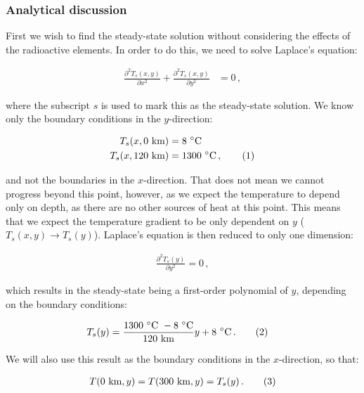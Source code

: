 \documentclass[reprint,english,notitlepage]{revtex4-1}  %
\newcommand\numberthis{\addtocounter{equation}{1}\tag{\theequation}}
\begin{document}
\subsubsection{Analytical discussion} \label{sec:formalism_heat_eq_with_source_term_analytical_sol}

First we wish to find the steady-state solution without considering the effects of the radioactive elements. In order to do this, we need to solve Laplace's equation:

\begin{align*}
\frac{\partial^2 T_s(x,y)}{\partial x^2} + \frac{\partial^2 T_s(x,y)}{\partial y^2} &= 0 \, ,
\end{align*}

where the subscript $s$ is used to mark this as the steady-state solution. We know only the boundary conditions in the $y$-direction:

\begin{align*}
T_s(x,0 \text{ km}) &= 8 \text{ } ^\circ\text{C} \\
T_s(x,120 \text{ km}) &= 1300 \text{ } ^\circ\text{C} \, , \numberthis \label{eq:heat_boundary_conditions_y}
\end{align*} 

and not the boundaries in the $x$-direction. That does not mean we cannot progress beyond this point, however, as we expect the temperature to depend only on depth, as there are no other sources of heat at this point. This means that we expect the temperature gradient to be only dependent on $y$ ($T_s(x,y) \to T_s(y)$). Laplace's equation is then reduced to only one dimension:

\begin{align*}
\frac{\partial^2 T_s(y)}{\partial y^2} = 0 \, ,
\end{align*}  

which results in the steady-state being a first-order polynomial of $y$, depending on the boundary conditions:

\begin{align*}
T_s(y) &= \frac{1300\text{ $^\circ$C }-8 \text{ $^\circ$C} }{120 \text{ km} } y + 8 \text{ $^\circ$C}\, . \numberthis \label{eq:steady_state_heat} 
\end{align*} 

We will also use this result as the boundary conditions in the $x$-direction, so that:

\begin{align*}
T(0 \text{ km},y) = T(300 \text{ km},y) = T_s(y) \, . \numberthis \label{eq:heat_boundary_conditions_x}
\end{align*}
\end{document}
